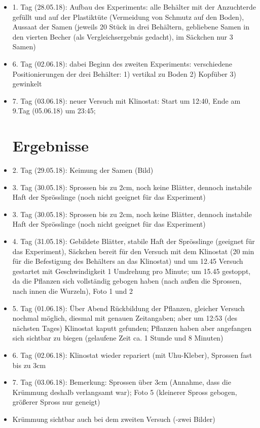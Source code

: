 \documentclass[
a4paper, 
11pt, 
ngerman,
listof=totoc,
bibliography=totocnumbered,
abstracton
]{scrreprt}
\begin{document}
\begin{itemize}
	
\item 1. Tag (28.05.18): Aufbau des Experiments: alle Behälter mit der Anzuchterde gefüllt und auf der Plastiktüte (Vermeidung von Schmutz auf den Boden), Aussaat der Samen (jeweils 20 Stück in drei Behältern, gebliebene Samen in den vierten Becher (als Vergleichsergebnis gedacht), im Säckchen nur 3 Samen)
	  
\item 6. Tag (02.06.18): dabei Beginn des zweiten Experiments: verschiedene Positionierungen der drei Behälter: 1) vertikal zu Boden 2) Kopfüber 3) gewinkelt 
	
\item 7. Tag (03.06.18): neuer Versuch mit Klinostat: Start um 12:40, Ende am 9.Tag (05.06.18) um 23:45; 

\section{Ergebnisse}

\item 2. Tag (29.05.18): Keimung der Samen (Bild)

\item 3. Tag (30.05.18): Sprossen bis zu 2cm, noch keine Blätter, dennoch instabile Haft der Sprösslinge (noch nicht geeignet für das Experiment) 

\item 3. Tag (30.05.18): Sprossen bis zu 2cm, noch keine Blätter, dennoch instabile Haft der Sprösslinge (noch nicht geeignet für das Experiment)

\item 4. Tag (31.05.18): Gebildete Blätter, stabile Haft der Sprösslinge (geeignet für das Experiment), Säckchen bereit für den Versuch mit dem Klinostat (20 min für die Befestigung des Behälters an das Klinostat) und um 12.45 Versuch gestartet mit Geschwindigkeit 1 Umdrehung pro Minute;
um 15.45 gestoppt, da die Pflanzen sich vollständig gebogen haben (nach außen die Sprossen, nach innen die Wurzeln), Foto 1 und 2

\item 5. Tag (01.06.18): Über Abend Rückbildung der Pflanzen, gleicher Versuch nochmal möglich, diesmal mit genauen Zeitangaben; aber um 12:53 (des nächsten Tages) Klinostat kaputt gefunden; Pflanzen haben aber angefangen sich sichtbar zu biegen (gelaufene Zeit ca. 1 Stunde und 8 Minuten)

\item 6. Tag (02.06.18): Klinostat wieder repariert (mit Uhu-Kleber), Sprossen fast bis zu 3cm

\item 7. Tag (03.06.18): Bemerkung: Sprossen über 3cm (Annahme, dass die Krümmung deshalb verlangsamt war); Foto 5 (kleinerer Spross gebogen, größerer Spross nur geneigt)

\item Krümmung sichtbar auch bei dem zweiten Versuch (-zwei Bilder)

\end{itemize}
\end{document}
